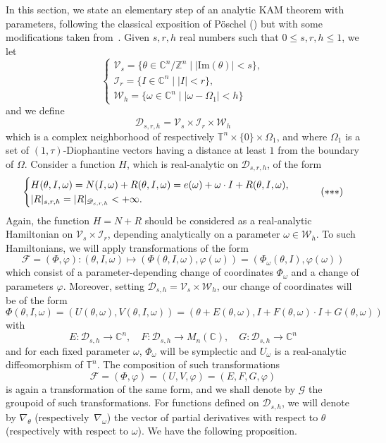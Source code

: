 \documentclass[JEP,XML,SOM,Unicode]{cedram}
\let\mathcal\mathscr
\let\sep\mid
\numberwithin{equation}{section}
\theoremstyle{plain}
\theoremstyle{definition}
\newcommand{\Z}{\mathbb{Z}}
\renewcommand{\C}{\mathbb{C}}
\newcommand\T{\mathbb T}
\begin{document}
In this section, we state an elementary step of an analytic KAM theorem with parameters, following the classical exposition of Pöschel (\cite{Pos01}) but with some modifications taken from~\cite{Rus01}. Given $s,r,h$ real numbers such that $0 \leq s,r,h \leq 1$, we let
\[
\begin{cases}
\mathcal{V}_s= \{ \theta \in \C^n / \Z^n \sep |\mathrm{Im}(\theta)|<s \}, \\
\mathcal{I}_{r}=\{ I \in \C^n \sep |I|<r \}, \\
\mathcal{W}_h=\{ \omega \in \C^n \sep |\omega-\Omega_1|<h \}
\end{cases}
\]
and we define
\[ \mathcal{D}_{s,r,h}=\mathcal{V}_s\times \mathcal{I}_r \times \mathcal{W}_h \]
which is a complex neighborhood of respectively $\T^n \times \{0\} \times \Omega_1$, and where $\Omega_1$ is a set of $(1,\tau)$-Diophantine vectors having a distance at least $1$ from the boundary of $\Omega$. Consider a function $H$, which is real-analytic on $\mathcal{D}_{s,r,h}$, of the form
\begin{equation}\label{Ham3}
\begin{cases}
H(\theta,I,\omega)=N(I,\omega)+R(\theta,I,\omega)=e(\omega)+\omega \cdot I+R(\theta,I,\omega), \\
|R|_{s,r,h}=|R|_{\mathcal{D}_{s,r,h}} <+\infty.
\end{cases}
\tag{${*}{*}{*}$}
\end{equation}
Again, the function $H=N+R$ should be considered as a real-analytic Hamiltonian on $\mathcal{V}_s \times \mathcal{I}_r$, depending analytically on a parameter $\omega \in \mathcal{W}_h$. To such Hamiltonians, we will apply transformations of the form
\[ \mathcal{F}=(\Phi,\varphi): (\theta,I,\omega) \mapsto (\Phi(\theta,I,\omega),\varphi(\omega))=(\Phi_\omega(\theta,I),\varphi(\omega)) \]
which consist of a parameter-depending change of coordinates $\Phi_\omega$ and a change of parameters $\varphi$. Moreover, setting $\mathcal{D}_{s,h}=\mathcal{V}_s \times \mathcal{W}_h$, our change of coordinates will be of
the form
\[\Phi(\theta,I,\omega)=(U(\theta,\omega),V(\theta,I,\omega))=(\theta+E(\theta,\omega),I+F(\theta,\omega)\cdot
I+G(\theta,\omega)) \] with
\[ E : \mathcal{D}_{s,h} \to \C^n, \quad F : \mathcal{D}_{s,h}
\to M_n(\C), \quad G : \mathcal{D}_{s,h} \to \C^n \]
and for each fixed parameter $\omega$, $\Phi_\omega$ will be
symplectic and $U_\omega$ is a real-analytic diffeomorphism of $\T^n$. The composition of such transformations
\[ \mathcal{F}=(\Phi,\varphi)=(U,V,\varphi)=(E,F,G,\varphi) \]
is again a transformation of the same form, and we shall denote by $\mathcal{G}$ the groupoid of such transformations. For functions defined on $\mathcal{D}_{s,h}$, we will denote by $\nabla_\theta$ (respectively~$\nabla_\omega$) the vector of partial derivatives with respect to $\theta$ (respectively with respect to $\omega$). We have the following proposition.
\end{document}
